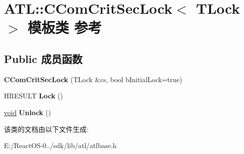 \hypertarget{class_a_t_l_1_1_c_com_crit_sec_lock}{}\section{A\+TL\+:\+:C\+Com\+Crit\+Sec\+Lock$<$ T\+Lock $>$ 模板类 参考}
\label{class_a_t_l_1_1_c_com_crit_sec_lock}
\subsection*{Public 成员函数}
\begin{DoxyCompactItemize}
\item 
\mbox{\label{class_a_t_l_1_1_c_com_crit_sec_lock_a3b577dbadc41c61bfeb538cfd67f2748}} 
{\bfseries C\+Com\+Crit\+Sec\+Lock} (T\+Lock \&cs, bool b\+Initial\+Lock=true)
\item 
\mbox{\label{class_a_t_l_1_1_c_com_crit_sec_lock_a9dcc513fd1bfc7c80bf9edd8adbfe06a}} 
H\+R\+E\+S\+U\+LT {\bfseries Lock} ()
\item 
\mbox{\label{class_a_t_l_1_1_c_com_crit_sec_lock_ad0e91835b6ca56db6b3dbd02dba629a6}} 
\hyperlink{interfacevoid}{void} {\bfseries Unlock} ()
\end{DoxyCompactItemize}


该类的文档由以下文件生成\+:\begin{DoxyCompactItemize}
\item 
E\+:/\+React\+O\+S-\/0../sdk/lib/atl/atlbase.\+h\end{DoxyCompactItemize}
